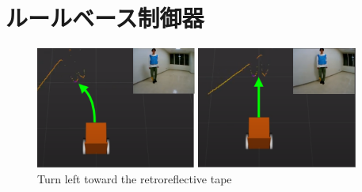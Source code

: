 
\section{ルールベース制御器}

\begin{figure}[h]
  \centering
  \begin{minipage}[c]{65mm} 
      \centering
      \includegraphics[height=40mm]{images/RobotGuidance_learning_turn_left_(a).png}
  \end{minipage}
  \begin{minipage}[c]{65mm} 
      \centering
      \includegraphics[height=40mm]{images/RobotGuidance_learning_turn_left_(b).png}
  \end{minipage}
  \caption{Turn left toward the retroreflective tape}
  \label{Fig:RobotGuidance_learning_turn_left}
\end{figure}

